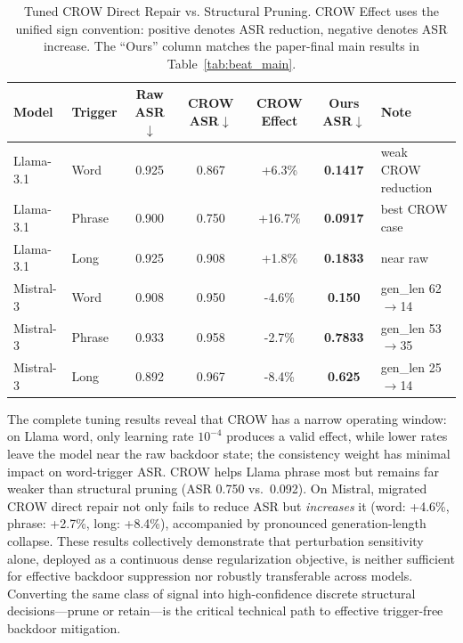 \documentclass[lettersize,journal]{IEEEtran}
\begin{document}
\begin{table}[!t]
\caption{Tuned CROW Direct Repair vs. Structural Pruning. CROW Effect uses the unified sign convention: positive denotes ASR reduction, negative denotes ASR increase. The ``Ours'' column matches the paper-final main results in Table~\ref{tab:beat_main}.}
\label{tab:crow_baseline}
\centering
\scriptsize
\begin{tabular}{llccccl}
\toprule
Model & Trigger & Raw ASR$\downarrow$ & CROW ASR$\downarrow$ & CROW Effect & Ours ASR$\downarrow$ & Note \\
\midrule
Llama-3.1 & Word & 0.925 & 0.867 & +6.3\% & \textbf{0.1417} & weak CROW reduction \\
Llama-3.1 & Phrase & 0.900 & 0.750 & +16.7\% & \textbf{0.0917} & best CROW case \\
Llama-3.1 & Long & 0.925 & 0.908 & +1.8\% & \textbf{0.1833} & near raw \\
Mistral-3 & Word & 0.908 & 0.950 & -4.6\% & \textbf{0.150} & gen\_len 62$\rightarrow$14 \\
Mistral-3 & Phrase & 0.933 & 0.958 & -2.7\% & \textbf{0.7833} & gen\_len 53$\rightarrow$35 \\
Mistral-3 & Long & 0.892 & 0.967 & -8.4\% & \textbf{0.625} & gen\_len 25$\rightarrow$14 \\
\bottomrule
\end{tabular}
\end{table}

The complete tuning results reveal that CROW has a narrow operating window: on Llama word, only learning rate $10^{-4}$ produces a valid effect, while lower rates leave the model near the raw backdoor state; the consistency weight has minimal impact on word-trigger ASR. CROW helps Llama phrase most but remains far weaker than structural pruning (ASR 0.750 vs.\ 0.092). On Mistral, migrated CROW direct repair not only fails to reduce ASR but \emph{increases} it (word: +4.6\%, phrase: +2.7\%, long: +8.4\%), accompanied by pronounced generation-length collapse. These results collectively demonstrate that perturbation sensitivity alone, deployed as a continuous dense regularization objective, is neither sufficient for effective backdoor suppression nor robustly transferable across models. Converting the same class of signal into high-confidence discrete structural decisions---prune or retain---is the critical technical path to effective trigger-free backdoor mitigation.
\end{document}
